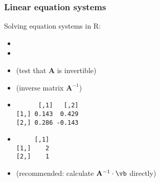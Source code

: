\begin{frame}[fragile]
  \frametitle{Linear equation systems}

  Solving equation systems in R:
  \begin{itemize}
  \item {}
  \item {}
  \item {} (test that $\mathbf{A}$ is invertible)%
  \item<2->  (inverse matrix $\mathbf{A}^{-1}$)
  \item<2-> 
    \begin{footnotesize}
\begin{verbatim}
      [,1]   [,2]
[1,] 0.143  0.429
[2,] 0.286 -0.143
\end{verbatim}
    \end{footnotesize}
    
  \item<3-> 
    \begin{footnotesize}
\begin{verbatim}
     [,1]
[1,]    2
[2,]    1
\end{verbatim}
    \end{footnotesize}
  \item<3->  (recommended: calculate
    $\mathbf{A}^{-1}\cdot \vb$ directly)
  \end{itemize}
  
\end{frame}

